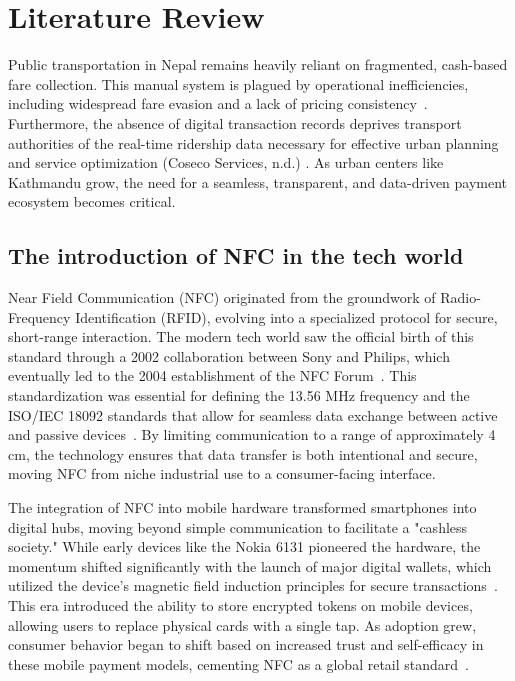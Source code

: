 \documentclass[sigconf, nonacm]{acmart}
\begin{document}
\section{Literature Review}
Public transportation in Nepal remains heavily reliant on fragmented, cash-based fare collection. This manual system is plagued by operational inefficiencies, including widespread fare evasion and a lack of pricing consistency~\cite{shreya2025nepal}. Furthermore, the absence of digital transaction records deprives transport authorities of the real-time ridership data necessary for effective urban planning and service optimization (Coseco Services, n.d.) \cite{coseco_services_working_nodate}. As urban centers like Kathmandu grow, the need for a seamless, transparent, and data-driven payment ecosystem becomes critical.

\subsection{The introduction of NFC in the tech world}

Near Field Communication (NFC) originated from the groundwork of Radio-Frequency Identification (RFID), evolving into a specialized protocol for secure, short-range interaction. The modern tech world saw the official birth of this standard through a 2002 collaboration between Sony and Philips, which eventually led to the 2004 establishment of the NFC Forum~\cite{kaiser2017nfc}. This standardization was essential for defining the 13.56 MHz frequency and the ISO/IEC 18092 standards that allow for seamless data exchange between active and passive devices~\cite{singh2020near}. By limiting communication to a range of approximately 4 cm, the technology ensures that data transfer is both intentional and secure, moving NFC from niche industrial use to a consumer-facing interface.

The integration of NFC into mobile hardware transformed smartphones into digital hubs, moving beyond simple communication to facilitate a "cashless society." While early devices like the Nokia 6131 pioneered the hardware, the momentum shifted significantly with the launch of major digital wallets, which utilized the device's magnetic field induction principles for secure transactions~\cite{nikam2017near}. This era introduced the ability to store encrypted tokens on mobile devices, allowing users to replace physical cards with a single tap. As adoption grew, consumer behavior began to shift based on increased trust and self-efficacy in these mobile payment models, cementing NFC as a global retail standard~\cite{aloufi2025investigating}.
\end{document}
